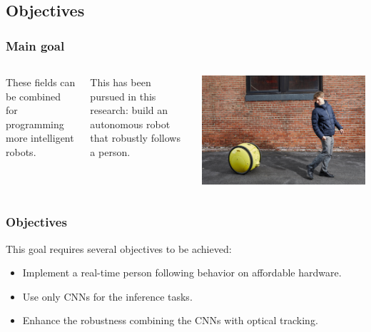 \documentclass[11pt]{beamer}
\begin{document}
\subsection{Objectives}
\begin{frame}
	\frametitle{Main goal}
	\begin{columns}
		These fields can be combined for programming more intelligent robots.\\
		\vspace{1cm}
		
		This has been pursued in this research: build an \alert{autonomous robot that robustly follows a person}.
		
		\vspace{4cm}
		\includegraphics[width=\linewidth]{robot_following} \\
	\end{columns}
\end{frame}

\begin{frame}
	\frametitle{Objectives}
	This goal requires several objectives to be achieved:\\
	\vspace{0.3cm}
	\begin{itemize}
		\item Implement a real-time person following behavior on affordable hardware.
		\item Use only CNNs for the inference tasks.
		\item Enhance the robustness combining the CNNs with optical tracking.
	\end{itemize}
\end{frame}
\end{document}
